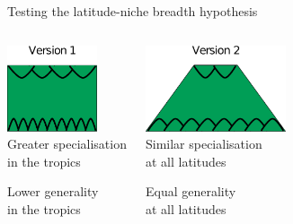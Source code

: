 \documentclass{beamer}
\begin{document}
  \begin{frame}{Testing the latitude-niche breadth hypothesis}
    \begin{columns}
    \column{.5in}
    \column{1.75in}
      \begin{center}
      \includegraphics[height=1in]{Figures/version1.eps}\\
      \vspace{.5cm}
      Greater specialisation\\in the tropics

      \vspace{.25cm}
      Lower generality\\in the tropics

      \end{center}
    \column{.5in}
    \column{1.75in}
      \begin{center}
      \includegraphics[height=1in]{Figures/version2.eps}\\
      \vspace{.5cm}
      Similar specialisation\\at all latitudes

      \vspace{.25cm}
      Equal generality\\at all latitudes

      \end{center}
    \column{.5in}
    \end{columns}

    \vspace{.5cm}

    \begin{center}
      \color{DarkGreen}{Generality : mean number of prey per species}
    \end{center}

  \end{frame}  
\end{document}
